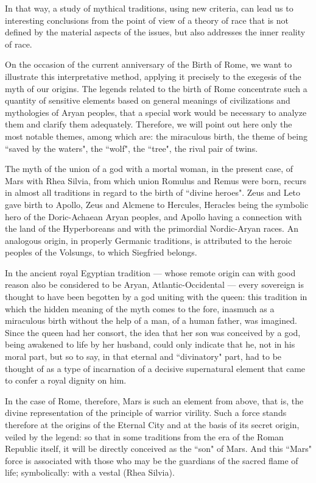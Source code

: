 In that way, a study of mythical traditions, using new criteria, can lead us to interesting conclusions from the point of view of a theory of race that is not defined by the material aspects of the issues, but also addresses the inner reality of race.

On the occasion of the current anniversary of the Birth of Rome, we want to illustrate this interpretative method, applying it precisely to the exegesis of the myth of our origins. The legends related to the birth of Rome concentrate such a quantity of sensitive elements based on general meanings of civilizations and mythologies of Aryan peoples, that a special work would be necessary to analyze them and clarify them adequately. Therefore, we will point out here only the most notable themes, among which are: the miraculous birth, the theme of being ``saved by the waters", the ``wolf", the ``tree", the rival pair of twins.

The myth of the union of a god with a mortal woman, in the present case, of Mars with Rhea Silvia, from which union Romulus and Remus were born, recurs in almost all traditions in regard to the birth of ``divine heroes". Zeus and Leto gave birth to Apollo, Zeus and Alcmene to Hercules, Heracles being the symbolic hero of the Doric-Achaean Aryan peoples, and Apollo having a connection with the land of the Hyperboreans and with the primordial Nordic-Aryan races. An analogous origin, in properly Germanic traditions, is attributed to the heroic peoples of the Volsungs, to which Siegfried belongs.

In the ancient royal Egyptian tradition — whose remote origin can with good reason also be considered to be Aryan, Atlantic-Occidental — every sovereign is thought to have been begotten by a god uniting with the queen: this tradition in which the hidden meaning of the myth comes to the fore, inasmuch as a miraculous birth without the help of a man, of a human father, was imagined. Since the queen had her consort, the idea that her son was conceived by a god, being awakened to life by her husband, could only indicate that he, not in his moral part, but so to say, in that eternal and ``divinatory" part, had to be thought of as a type of incarnation of a decisive supernatural element that came to confer a royal dignity on him.

In the case of Rome, therefore, Mars is such an element from above, that is, the divine representation of the principle of warrior virility. Such a force stands therefore at the origins of the Eternal City and at the basis of its secret origin, veiled by the legend: so that in some traditions from the era of the Roman Republic itself, it will be directly conceived as the ``son" of Mars. And this ``Mars" force is associated with those who may be the guardians of the sacred flame of life; symbolically: with a vestal (Rhea Silvia).

